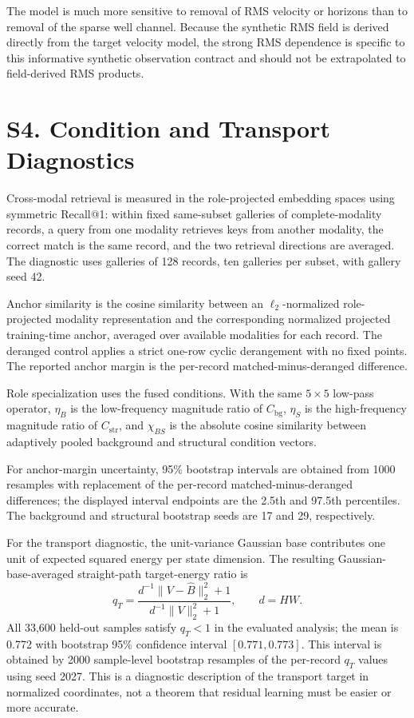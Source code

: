 \documentclass[11pt]{article}
\begin{document}
The model is much more sensitive to removal of RMS velocity or horizons than to removal of the sparse well channel. Because the synthetic RMS field is derived directly from the target velocity model, the strong RMS dependence is specific to this informative synthetic observation contract and should not be extrapolated to field-derived RMS products.

\section{S4. Condition and Transport Diagnostics}

Cross-modal retrieval is measured in the role-projected embedding spaces using symmetric Recall@1: within fixed same-subset galleries of complete-modality records, a query from one modality retrieves keys from another modality, the correct match is the same record, and the two retrieval directions are averaged. The diagnostic uses galleries of 128 records, ten galleries per subset, with gallery seed 42.

Anchor similarity is the cosine similarity between an $\ell_2$-normalized role-projected modality representation and the corresponding normalized projected training-time anchor, averaged over available modalities for each record. The deranged control applies a strict one-row cyclic derangement with no fixed points. The reported anchor margin is the per-record matched-minus-deranged difference.

Role specialization uses the fused conditions. With the same $5\times5$ low-pass operator, $\eta_B$ is the low-frequency magnitude ratio of $C_{\mathrm{bg}}$, $\eta_S$ is the high-frequency magnitude ratio of $C_{\mathrm{str}}$, and $\chi_{BS}$ is the absolute cosine similarity between adaptively pooled background and structural condition vectors.

For anchor-margin uncertainty, 95\% bootstrap intervals are obtained from 1000 resamples with replacement of the per-record matched-minus-deranged differences; the displayed interval endpoints are the 2.5th and 97.5th percentiles. The background and structural bootstrap seeds are 17 and 29, respectively.

For the transport diagnostic, the unit-variance Gaussian base contributes one unit of expected squared energy per state dimension. The resulting Gaussian-base-averaged straight-path target-energy ratio is
\begin{equation}
q_T=
\frac{d^{-1}\|V-\hat B\|_2^2+1}
{d^{-1}\|V\|_2^2+1},
\qquad d=HW .
\end{equation}
All 33,600 held-out samples satisfy $q_T<1$ in the evaluated analysis; the mean is 0.772 with bootstrap 95\% confidence interval $[0.771,0.773]$. This interval is obtained by 2000 sample-level bootstrap resamples of the per-record $q_T$ values using seed 2027. This is a diagnostic description of the transport target in normalized coordinates, not a theorem that residual learning must be easier or more accurate.
\end{document}
